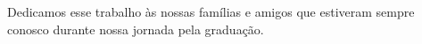 Dedicamos esse trabalho às nossas famílias e amigos que estiveram sempre conosco durante nossa jornada pela graduação.